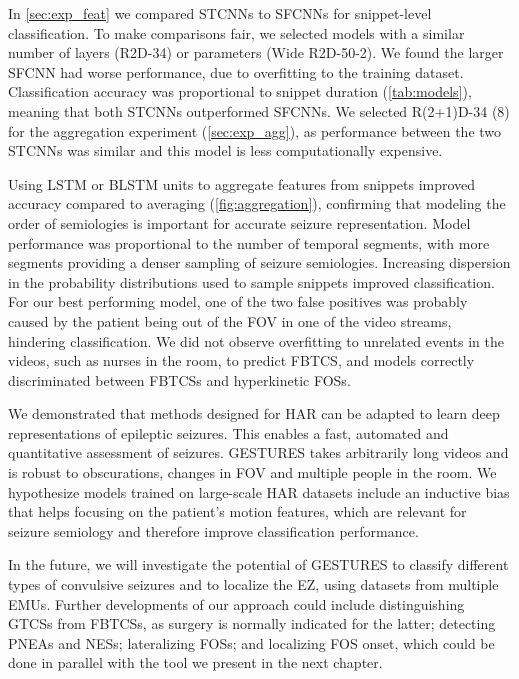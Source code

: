In \cref{sec:exp_feat} we compared \acp{STCNN} to \acp{SFCNN} for snippet-level classification.
To make comparisons fair, we selected models with a similar number of layers (R2D-34) or parameters (Wide R2D-50-2).
We found the larger \ac{SFCNN} had worse performance, due to overfitting to the training dataset.
Classification accuracy was proportional to snippet duration (\cref{tab:models}), meaning that both \acp{STCNN} outperformed \acp{SFCNN}.
We selected R(2+1)D-34 (8) for the aggregation experiment (\cref{sec:exp_agg}), as performance between the two \acp{STCNN} was similar and this model is less computationally expensive.

Using \ac{LSTM} or \ac{BLSTM} units to aggregate features from snippets improved accuracy compared to averaging (\cref{fig:aggregation}), confirming that modeling the order of semiologies is important for accurate seizure representation.
Model performance was proportional to the number of temporal segments, with more segments providing a denser sampling of seizure semiologies. %
Increasing dispersion in the probability distributions used to sample snippets improved classification.
For our best performing model, one of the two false positives was probably caused by the patient being out of the \ac{FOV} in one of the video streams, hindering classification.
We did not observe overfitting to unrelated events in the videos, such as nurses in the room, to predict \ac{FBTCS}, and models correctly discriminated between \acp{FBTCS} and hyperkinetic \acp{FOS}.

We demonstrated that methods designed for \ac{HAR} can be adapted to learn deep representations of epileptic seizures.
This enables a fast, automated and quantitative assessment of seizures.
\Ac{GESTURES} takes arbitrarily long videos and is robust to obscurations, changes in \ac{FOV} and multiple people in the room.
We hypothesize models trained on large-scale \ac{HAR} datasets include an inductive bias that helps focusing on the patient's motion features, which are relevant for seizure semiology and therefore improve classification performance.

In the future, we will investigate the potential of \ac{GESTURES} to classify different types of convulsive seizures and to localize the \ac{EZ}, using datasets from multiple \acp{EMU}.
Further developments of our approach could include
distinguishing \acp{GTCS} from \acp{FBTCS}, as surgery is normally indicated for the latter;
detecting \acp{PNEA} and \acp{NES};
lateralizing \acp{FOS};
and localizing \ac{FOS} onset, which could be done in parallel with the tool we present in the next chapter.
